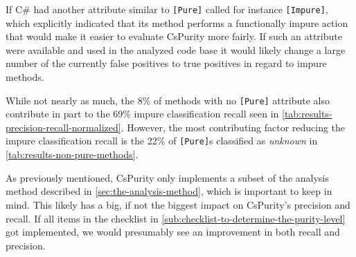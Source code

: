\documentclass[a4paper,12pt]{article}
\begin{document}
If C\# had another attribute similar to \texttt{[Pure]} called for instance \texttt{[Impure]}, which explicitly indicated that its method performs a functionally impure action that would make it easier to evaluate CsPurity more fairly. If such an attribute were available and used in the analyzed code base it would likely change a large number of the currently false positives to true positives in regard to impure methods. %

While not nearly as much, the 8\% of methods with no \texttt{[Pure]} attribute also contribute in part to the 69\% impure classification recall seen in \autoref{tab:results-precision-recall-normalized}. However, the most contributing factor reducing the impure classification recall is the 22\% of \texttt{[Pure]}s classified as \textit{unknown} in \autoref{tab:results-non-pure-methods}.

As previously mentioned, CsPurity only implements a subset of the analysis method described in \autoref{sec:the-analysis-method}, which is important to keep in mind. This likely has a big, if not the biggest impact on CsPurity's precision and recall. If all items in the checklist in \autoref{sub:checklist-to-determine-the-purity-level} got implemented, we would presumably see an improvement in both recall and precision.

\end{document}
